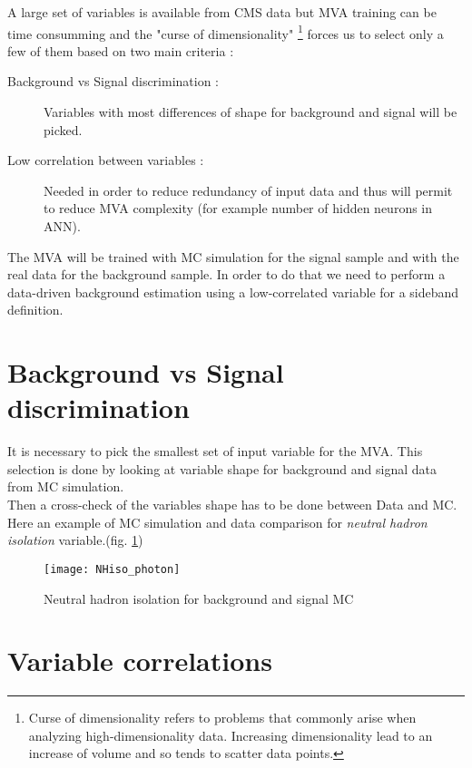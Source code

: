 \label{sec:unchapitre}

A large set of variables is available from CMS data but MVA training can be time consumming and the "curse of
dimensionality" \footnote{Curse of dimensionality refers to problems that commonly arise when analyzing high-dimensionality data.
Increasing dimensionality lead to an increase of volume and so tends to scatter data points.} forces us to select only a few of them based on two main criteria :
\begin{description}
    \item [Background vs Signal discrimination :] Variables with most differences of shape for background and signal will be picked.
    \item [Low correlation between variables :] Needed in order to reduce redundancy of input data and thus will permit
    to reduce MVA complexity (for example number of hidden neurons in ANN).
\end{description}

The MVA will be trained with MC simulation for the signal sample and with the real data for the background sample.
In order to do that we need to perform a data-driven background estimation using a low-correlated variable for a
sideband definition.

\section{Background vs Signal discrimination}

It is necessary to pick the smallest set of input variable for the MVA. This selection is done by looking at variable
shape for background and signal data from MC simulation.\\
Then a cross-check of the variables shape has to be done between Data and MC.\\
Here an example of MC simulation and data comparison for \emph{neutral hadron isolation} variable.(fig.
\ref{NHiso_photon_dataVsMCbg}) \\

\begin{figure}[h!]
  \centering
  \texttt{[image: NHiso\_photon]}\\[1cm]
  \caption{Neutral hadron isolation for background and signal MC}
  \label{NHiso_photon_dataVsMCbg}
\end{figure}

\section{Variable correlations}


